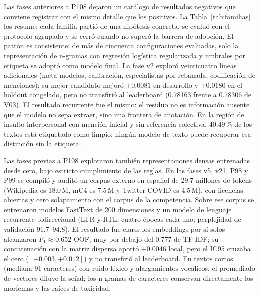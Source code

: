 Las fases anteriores a P108 dejaron un catálogo de resultados negativos que
conviene registrar con el mismo detalle que los positivos. La
Tabla~\ref{tab:familias} los resume: cada familia partió de una hipótesis
concreta, se evaluó con el protocolo agrupado y se cerró cuando no superó la
barrera de adopción. El patrón es consistente: de más de cincuenta
configuraciones evaluadas, solo la representación de n-gramas con regresión
logística regularizada y umbrales por etiqueta se adoptó como modelo final.
La fase v2 exploró veinticuatro líneas adicionales (meta-modelos, calibración,
especialistas por rebanada, codificación de menciones); su mejor candidato
mejoró $+0.0081$ en desarrollo y $+0.0180$ en el holdout congelado, pero no
transfirió al leaderboard (0.78163 frente a 0.78306 de V03).
El resultado recurrente fue el mismo: el residuo no es información ausente
que el modelo no sepa extraer, sino una frontera de anotación. En la región
de insulto interpersonal con mención inicial y sin referencia colectiva,
40.49\,\% de los textos está etiquetado como limpio; ningún modelo de texto
puede recuperar esa distinción sin la etiqueta.

Las fases previas a P108 exploraron también representaciones densas entrenadas
desde cero, bajo estricto cumplimiento de las reglas. En las fases v5, v21,
P98 y P99 se compiló y auditó un corpus externo en español de 29.7 millones de
tokens (Wikipedia-es 18.0\,M, mC4-es 7.5\,M y Twitter COVID-es 4.5\,M), con
licencias abiertas y cero solapamiento con el corpus de la competencia. Sobre
ese corpus se entrenaron modelos FastText de 200 dimensiones
\cite{bojanowski2017enriching} y un modelo de lenguaje recurrente
bidireccional (LTR y RTL, cuatro épocas cada uno; perplejidad de validación
91.7--94.8). El resultado fue claro: los embeddings por sí solos alcanzaron
$F_1 \approx 0.652$ OOF, muy por debajo del 0.777 de TF-IDF; su concatenación
con la matriz dispersa aportó $+0.0046$ local, pero el IC95 cruzaba el cero
($[-0.003, +0.012]$) y no transfirió al leaderboard. En textos cortos
(mediana 91 caracteres) con ruido léxico y alargamientos vocálicos, el
promediado de vectores diluye la señal; los n-gramas de caracteres conservan
directamente los morfemas y las raíces de toxicidad.

